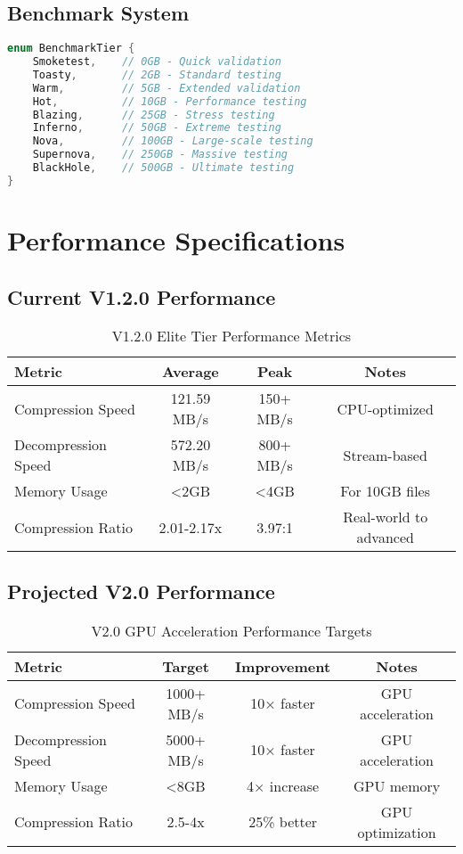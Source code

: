 \documentclass[12pt,a4paper]{article}
\begin{document}
\subsection{Benchmark System}
\begin{lstlisting}[language=Rust, caption=Performance Tiers]
enum BenchmarkTier {
    Smoketest,    // 0GB - Quick validation
    Toasty,       // 2GB - Standard testing
    Warm,         // 5GB - Extended validation
    Hot,          // 10GB - Performance testing
    Blazing,      // 25GB - Stress testing
    Inferno,      // 50GB - Extreme testing
    Nova,         // 100GB - Large-scale testing
    Supernova,    // 250GB - Massive testing
    BlackHole,    // 500GB - Ultimate testing
}
\end{lstlisting}

\newpage

\section{Performance Specifications}

\subsection{Current V1.2.0 Performance}
\begin{table}[h]
\centering
\begin{tabular}{|l|c|c|c|}
\hline
\textbf{Metric} & \textbf{Average} & \textbf{Peak} & \textbf{Notes} \\
\hline
Compression Speed & 121.59 MB/s & 150+ MB/s & CPU-optimized \\
Decompression Speed & 572.20 MB/s & 800+ MB/s & Stream-based \\
Memory Usage & <2GB & <4GB & For 10GB files \\
Compression Ratio & 2.01-2.17x & 3.97:1 & Real-world to advanced \\
\hline
\end{tabular}
\caption{V1.2.0 Elite Tier Performance Metrics}
\end{table}

\subsection{Projected V2.0 Performance}
\begin{table}[h]
\centering
\begin{tabular}{|l|c|c|c|}
\hline
\textbf{Metric} & \textbf{Target} & \textbf{Improvement} & \textbf{Notes} \\
\hline
Compression Speed & 1000+ MB/s & 10× faster & GPU acceleration \\
Decompression Speed & 5000+ MB/s & 10× faster & GPU acceleration \\
Memory Usage & <8GB & 4× increase & GPU memory \\
Compression Ratio & 2.5-4x & 25\% better & GPU optimization \\
\hline
\end{tabular}
\caption{V2.0 GPU Acceleration Performance Targets}
\end{table}
\end{document}
